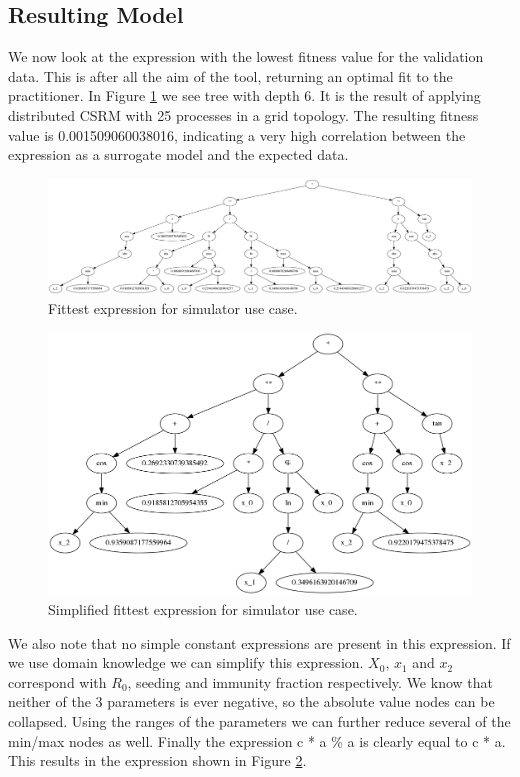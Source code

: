 \subsection{Resulting Model}
We now look at the expression with the lowest fitness value for the validation data. This is after all the aim of the tool, returning an optimal fit to the practitioner. In Figure \ref{fig:bestusecase} we see tree with depth 6. It is the result of applying distributed CSRM with 25 processes in a grid topology. The resulting fitness value is 0.001509060038016, indicating a very high correlation between the expression as a  surrogate model and the expected data. 
\begin{figure}
    \centering
    \includegraphics[width=\textwidth,height=\textheight,keepaspectratio]{figures/bestusecase.png}
    \caption{Fittest expression for simulator use case.}
    \label{fig:bestusecase}
\end{figure}
\begin{figure}
    \centering
    \includegraphics[width=\textwidth,height=\textheight,keepaspectratio]{figures/bestusecasesimple.png}
    \caption{Simplified fittest expression for simulator use case.}
    \label{fig:bestusecasesimple}
\end{figure}
We also note that no simple constant expressions are present in this expression. If we use domain knowledge we can simplify this expression. $X_0$, $x_1$ and $x_2$ correspond with $R_0$, seeding and immunity fraction respectively. We know that neither of the 3 parameters is ever negative, so the absolute value nodes can be collapsed. Using the ranges of the parameters we can further reduce several of the min/max nodes as well. Finally the expression c * a \% a is clearly equal to c * a. This results in the expression shown in Figure \ref{fig:bestusecasesimple}. 
